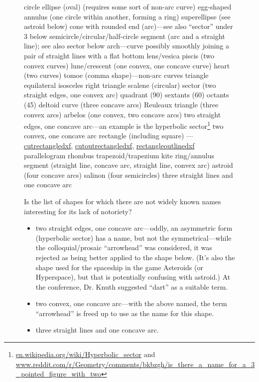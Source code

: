 \documentclass{ltxdoc}
\begin{document}
\begin{figure}
\begin{outline}
   \2 circle
   \2 ellipse (oval) (requires some sort of non-arc curve)
      \3 egg-shaped
   \2 annulus (one circle within another, forming  a ring)
   \2 superellipse (see astroid below)
   \2 cone with rounded end (arc)—see also ``sector'' under 3 below
   \2 semicircle/circular/half-circle segment (arc and a straight line); see also sector below
   \2 arch---curve possibly smoothly joining a  pair of straight lines with a flat bottom
   \2 lens/vesica piscis (two convex curves)
   \2 lune/crescent (one convex, one concave  curve)
   \2 heart (two curves)
   \2 tomoe (comma shape)---non-arc curves
   \2 triangle
      \3 equilateral
      \3 isosceles
      \3 right triangle
      \3 scalene
   \2 (circular) sector (two straight edges, one convex arc)
      \3 quadrant (90\textdegree)
      \3 sextants (60\textdegree)
      \3 octants (45\textdegree)
   \2 deltoid curve (three concave arcs)
   \2  Reuleaux triangle (three convex arcs)
   \2 arbelos (one convex, two concave arcs)
   \2 two straight edges, one concave arc---an example is the hyperbolic sector\footnote{\url{en.wikipedia.org/wiki/Hyperbolic_sector} and
 \url{www.reddit.com/r/Geometry/comments/bkbzgh/is_there_a_name_for_a_3_pointed_figure_with_two}}
   \2 two convex, one concave arc
   \2 rectangle (including square) --- \hyperref[routine:cutrectangledxf]{cutrectangledxf},
                                       \hyperref[routine:cutoutrectangledxf]{cutoutrectangledxf},
                                       \hyperref[routine:rectangleoutlinedxf]{rectangleoutlinedxf} 
   \2 parallelogram
   \2 rhombus
   \2 trapezoid/trapezium
   \2 kite
   \2 ring/annulus segment (straight line, concave arc, straight line, convex arc)
   \2 astroid (four concave arcs)
   \2 salinon (four semicircles)
   \2 three straight lines and one concave arc
\end{outline}


  Is the list of shapes for which there are not widely
 known names interesting for its lack of notoriety?

\begin{itemize}
 \item two straight edges, one concave arc—oddly, an asymmetric form (hyperbolic sector) has a name,
       but not the symmetrical---while the colloquial/prosaic “arrowhead” was considered, it was
       rejected as being better applied to the shape below. (It’s also the shape used for the
       spaceship in the game Asteroids (or Hyperspace), but that  is potentially confusing with
       astroid.) At the  conference, Dr. Knuth suggested “dart” as a suitable term.
 \item two convex, one concave arc—with the above named, the term “arrowhead” is freed up to use
       as the name for this shape.
 \item three straight lines and one concave arc.
 \end{itemize}


\end{figure}
\end{document}
